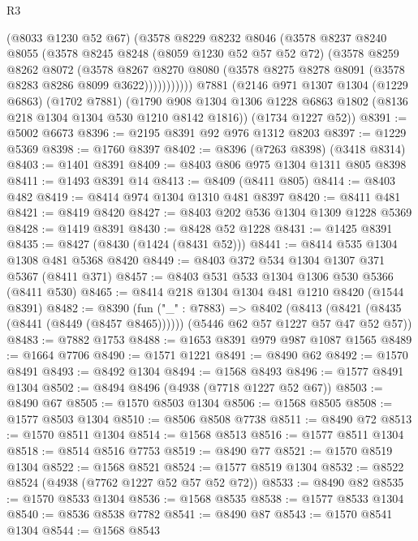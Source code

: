 \begin{lexlean}{R3}
\begin{coremodule}
            (@8033 @1230 @52 @67)
            (@3578
              @8229
              @8232
              @8046
              (@3578
                @8237
                @8240
                @8055
                (@3578
                  @8245
                  @8248
                  (@8059 @1230 @52 @57 @52 @72)
                  (@3578
                    @8259
                    @8262
                    @8072
                    (@3578
                      @8267
                      @8270
                      @8080
                      (@3578 @8275 @8278 @8091 (@3578 @8283 @8286 @8099 @3622)))))))))))
    @7881
    (@2146
      @971
      @1307
      @1304
      (@1229 @6863)
      (@1702 @7881)
      (@1790 @908 @1304 @1306 @1228 @6863 @1802 (@8136 @218 @1304 @1304 @530 @1210 @8142 @1816))
      (@1734 @1227 @52))
@8391 := @5002 @6673
@8396 := @2195 @8391 @92 @976 @1312 @8203
@8397 := @1229 @5369
@8398 := @1760 @8397
@8402 := @8396 (@7263 @8398) (@3418 @8314)
@8403 := @1401 @8391
@8409 := @8403 @806 @975 @1304 @1311 @805 @8398
@8411 := @1493 @8391 @14
@8413 := @8409 (@8411 @805)
@8414 := @8403 @482
@8419 := @8414 @974 @1304 @1310 @481 @8397
@8420 := @8411 @481
@8421 := @8419 @8420
@8427 := @8403 @202 @536 @1304 @1309 @1228 @5369
@8428 := @1419 @8391
@8430 := @8428 @52 @1228
@8431 := @1425 @8391
@8435 := @8427 (@8430 (@1424 (@8431 @52)))
@8441 := @8414 @535 @1304 @1308 @481 @5368 @8420
@8449 := @8403 @372 @534 @1304 @1307 @371 @5367 (@8411 @371)
@8457 := @8403 @531 @533 @1304 @1306 @530 @5366 (@8411 @530)
@8465 := @8414 @218 @1304 @1304 @481 @1210 @8420 (@1544 @8391)
@8482 := @8390
    (fun ("_" : @7883) =>
    @8402
      (@8413 (@8421 (@8435 (@8441 (@8449 (@8457 @8465))))))
      (@5446 @62 @57 @1227 @57 @47 @52 @57))
@8483 := @7882 @1753
@8488 := @1653 @8391 @979 @987 @1087 @1565
@8489 := @1664 @7706
@8490 := @1571 @1221
@8491 := @8490 @62
@8492 := @1570 @8491
@8493 := @8492 @1304
@8494 := @1568 @8493
@8496 := @1577 @8491 @1304
@8502 := @8494 @8496 (@4938 (@7718 @1227 @52 @67))
@8503 := @8490 @67
@8505 := @1570 @8503 @1304
@8506 := @1568 @8505
@8508 := @1577 @8503 @1304
@8510 := @8506 @8508 @7738
@8511 := @8490 @72
@8513 := @1570 @8511 @1304
@8514 := @1568 @8513
@8516 := @1577 @8511 @1304
@8518 := @8514 @8516 @7753
@8519 := @8490 @77
@8521 := @1570 @8519 @1304
@8522 := @1568 @8521
@8524 := @1577 @8519 @1304
@8532 := @8522 @8524 (@4938 (@7762 @1227 @52 @57 @52 @72))
@8533 := @8490 @82
@8535 := @1570 @8533 @1304
@8536 := @1568 @8535
@8538 := @1577 @8533 @1304
@8540 := @8536 @8538 @7782
@8541 := @8490 @87
@8543 := @1570 @8541 @1304
@8544 := @1568 @8543

\end{coremodule}
\end{lexlean}
